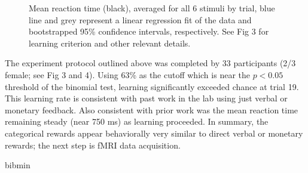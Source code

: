 \documentclass[doc,12pt]{apa}        %
\begin{document}
\begin{figure}[tp]
	\label{fig:rt}
	\caption{Mean reaction time (black), averaged for all 6 stimuli by trial, blue line and grey represent a linear regression fit of the data and bootstrapped 95\% confidence intervals, respectively. See Fig 3 for learning criterion and other relevant details.}
\end{figure}

The experiment protocol outlined above was completed by 33 participants (2/3 female; see Fig 3 and 4).  Using 63\% as the cutoff which is near the $p < 0.05$ threshold of the binomial test, learning significantly exceeded chance at trial 19.  This learning rate is consistent with past work in the lab using just verbal or monetary feedback.  Also consistent with prior work was the mean reaction time remaining steady (near 750 ms) as learning proceeded.  In summary, the categorical rewards appear behaviorally very similar to direct verbal or monetary rewards; the next step is fMRI data acquisition.

\newpage
 {bibmin}

\end{document}
